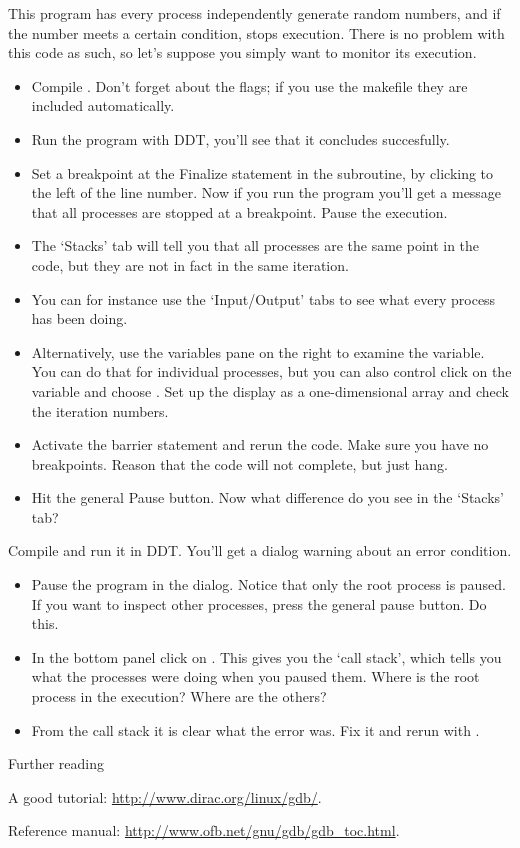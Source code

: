 \begin{pcse}
 This program has every process independently generate
random numbers, and if the number meets a certain condition, stops execution.
There is no problem with this code as such, so let's suppose you simply want
to monitor its execution.
\begin{itemize}
\item Compile . Don't forget about the  flags;
  if you use the makefile they are included automatically.
\item Run the program with DDT, you'll see that it concludes
  succesfully.
\item Set a breakpoint at the Finalize statement in the subroutine, by
  clicking to the left of the line number. Now if you run the program
  you'll get a message that all processes are stopped at a
  breakpoint. Pause the execution.
\item The `Stacks' tab will tell you that all processes are the same
  point in the code, but they are not in fact in the same
  iteration. 
\item You can for instance use the `Input/Output' tabs to see what every process has been doing.
\item Alternatively, use the variables pane on the right to examine
  the  variable. You can do that for individual processes, but
  you can also control click on the  variable and choose . Set up the display as a one-dimensional array and check
  the iteration numbers.
\item Activate the barrier statement and rerun the code. Make sure you
  have no breakpoints. Reason that the code will not complete, but
  just hang.
\item Hit the general Pause button. Now what difference do you see in the `Stacks' tab?
\end{itemize}

 Compile  and run it in DDT. You'll
get a dialog warning about an error condition.
\begin{itemize}
\item Pause the program in the dialog. Notice that only the root process is
  paused. If you want to inspect other processes, press the general
  pause button. Do this.
\item In the bottom panel click on . This gives you the
  `call stack', which tells you what the processes were doing when you
  paused them. Where is the root process in the execution? Where are
  the others?
\item From the call stack it is clear what the error was. Fix it and
  rerun with .
\end{itemize}


\end{pcse}


 {Further reading}

A good tutorial: \url{http://www.dirac.org/linux/gdb/}.

Reference manual: \url{http://www.ofb.net/gnu/gdb/gdb_toc.html}.

